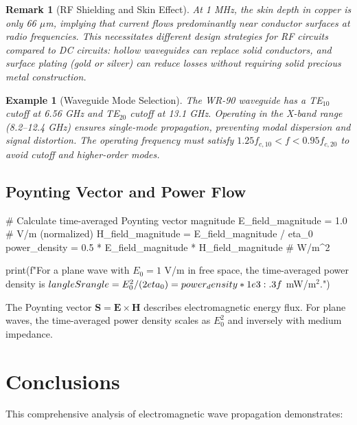 \documentclass[a4paper, 11pt]{article}
\newtheorem{example}{Example}[section]
\newtheorem{remark}{Remark}[section]
\begin{document}
\begin{remark}[RF Shielding and Skin Effect]
At 1 MHz, the skin depth in copper is only 66 $\mu$m, implying that current flows
predominantly near conductor surfaces at radio frequencies. This necessitates different
design strategies for RF circuits compared to DC circuits: hollow waveguides can
replace solid conductors, and surface plating (gold or silver) can reduce losses
without requiring solid precious metal construction.
\end{remark}

\begin{example}[Waveguide Mode Selection]
The WR-90 waveguide has a TE$_{10}$ cutoff at 6.56 GHz and TE$_{20}$ cutoff at
13.1 GHz. Operating in the X-band range (8.2--12.4 GHz) ensures single-mode propagation,
preventing modal dispersion and signal distortion. The operating frequency must satisfy
$1.25 f_{c,10} < f < 0.95 f_{c,20}$ to avoid cutoff and higher-order modes.
\end{example}

\subsection{Poynting Vector and Power Flow}

\begin{pycode}
# Calculate time-averaged Poynting vector magnitude
E_field_magnitude = 1.0  # V/m (normalized)
H_field_magnitude = E_field_magnitude / eta_0
power_density = 0.5 * E_field_magnitude * H_field_magnitude  # W/m^2

print(f"For a plane wave with $E_0 = 1$ V/m in free space, the time-averaged power density is $\\langle S \\rangle = E_0^2/(2\\eta_0) = {power_density*1e3:.3f}$ mW/m$^2$.")
\end{pycode}

The Poynting vector $\mathbf{S} = \mathbf{E} \times \mathbf{H}$ describes electromagnetic
energy flux. For plane waves, the time-averaged power density scales as $E_0^2$ and
inversely with medium impedance.

\section{Conclusions}

This comprehensive analysis of electromagnetic wave propagation demonstrates:
\end{document}
